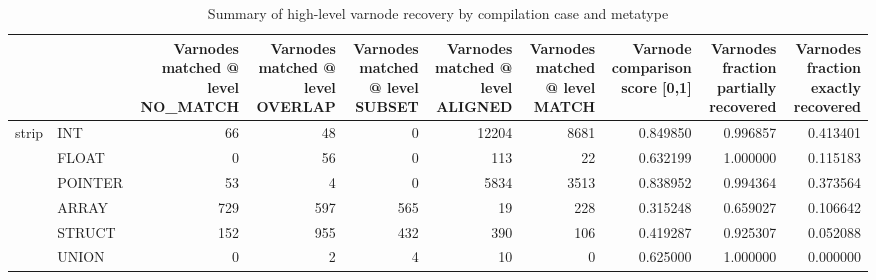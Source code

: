 \begin{table}
\centering
\caption{Summary of high-level varnode recovery by compilation case and metatype}
\label{table:opts-varnodes-summary-metatypes}
\begin{tabular}{llrrrrrrrr}
\toprule
      &       &  Varnodes matched @ level NO\_MATCH &  Varnodes matched @ level OVERLAP &  Varnodes matched @ level SUBSET &  Varnodes matched @ level ALIGNED &  Varnodes matched @ level MATCH &  Varnode comparison score [0,1] &  Varnodes fraction partially recovered &  Varnodes fraction exactly recovered \\
\midrule
\multirow{6}{*}{strip} & INT &                                 66 &                                48 &                                0 &                             12204 &                            8681 &                        0.849850 &                               0.996857 &                             0.413401 \\
      & FLOAT &                                  0 &                                56 &                                0 &                               113 &                              22 &                        0.632199 &                               1.000000 &                             0.115183 \\
      & POINTER &                                 53 &                                 4 &                                0 &                              5834 &                            3513 &                        0.838952 &                               0.994364 &                             0.373564 \\
      & ARRAY &                                729 &                               597 &                              565 &                                19 &                             228 &                        0.315248 &                               0.659027 &                             0.106642 \\
      & STRUCT &                                152 &                               955 &                              432 &                               390 &                             106 &                        0.419287 &                               0.925307 &                             0.052088 \\
      & UNION &                                  0 &                                 2 &                                4 &                                10 &                               0 &                        0.625000 &                               1.000000 &                             0.000000 \\

\end{tabular}
\end{table}
